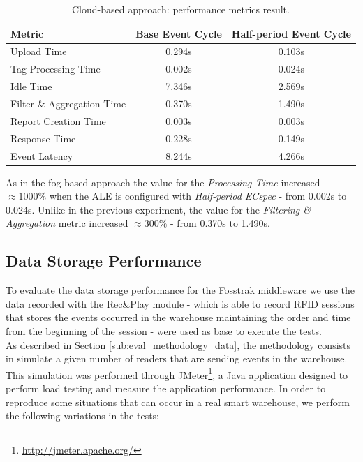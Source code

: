 \begin{table}[ht!]
  \centering
    \begin{tabular}{|l|c|c|}
    \hline
    Metric                     & Base Event Cycle & Half-period Event Cycle \\ \hline
    Upload Time                & 0.294s           & 0.103s                  \\ \hline
    Tag Processing Time        & 0.002s           & 0.024s                  \\ \hline
    Idle Time                  & 7.346s           & 2.569s                  \\ \hline
    Filter \& Aggregation Time & 0.370s           & 1.490s                  \\ \hline
    Report Creation Time       & 0.003s           & 0.003s                  \\ \hline
    Response Time              & 0.228s           & 0.149s                  \\ \hline
    Event Latency              & 8.244s           & 4.266s                  \\ \hline
    \end{tabular}
  \caption{Cloud-based approach: performance metrics result.}
  \label{table:cloud_metrics}
\end{table}

As in the fog-based approach the value for the \textit{Processing Time} increased $\approx1000\%$ when
the \gls{ALE} is configured with \textit{Half-period ECspec} - from 0.002s to 0.024s. Unlike in the
previous experiment, the value for the \textit{Filtering \& Aggregation} metric increased $\approx300\%$
- from 0.370s to 1.490s.

\subsection{Data Storage Performance}
\label{sub:eval_exp_data}
To evaluate the data storage performance for the Fosstrak middleware we use the data recorded with the Rec\&Play
module - which is able to record \gls{RFID} sessions that stores the events occurred in the warehouse
maintaining the order and time from the beginning of the session - were used as base to execute
the tests.\\

As described in Section \ref{sub:eval_methodology_data}, the methodology consists in simulate a given
number of readers that are sending events in the warehouse. This simulation was performed through JMeter\footnote{\url{http://jmeter.apache.org/}},
a Java application designed to perform load testing and measure the application performance.
In order to reproduce some situations that can occur in a real smart warehouse, we perform the following
variations in the tests:

